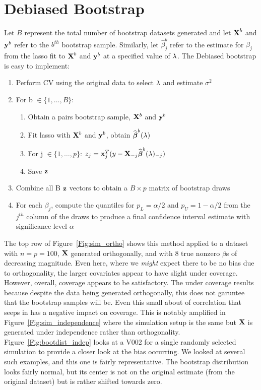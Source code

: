 \section{Debiased Bootstrap}

Let $B$ represent the total number of bootstrap datasets generated and let $\boldsymbol{\mathbf{X}}^b$ and $\boldsymbol{\mathbf{y}}^{b}$ refer to the $b^{th}$ bootstrap sample. Similarly, let $\hat{\beta}^b_j$ refer to the estimate for $\beta_j$ from the lasso fit to $\boldsymbol{\mathbf{X}}^b$ and $\boldsymbol{\mathbf{y}}^b$ at a specified value of $\lambda$. The Debiased bootstrap is easy to implement:

\begin{enumerate}
\item Perform CV using the original data to select $\lambda$ and estimate $\sigma^2$
\item For b $\in \lbrace 1, \ldots, B \rbrace$:
\begin{enumerate}
\item Obtain a pairs bootstrap sample, $\mathbf{X}^b$ and $\mathbf{y}^b$
\item Fit lasso with $\mathbf{X}^b$ and $\mathbf{y}^b$, obtain $\widehat{\boldsymbol{\beta}}^b(\lambda)$
\item For j $\in \lbrace 1, \ldots, p \rbrace$:
    $z_j = \mathbf{x}_j^T(y - \mathbf{X}_{-j}\widehat{\boldsymbol{\beta}}^b(\lambda)_{-j})$
\item Save $\mathbf{z}$
\end{enumerate}
\item Combine all B $\mathbf{z}$ vectors to obtain a $B \times p$ matrix of bootstrap draws
\item For each $\beta_j$, compute the quantiles for $p_L = \alpha/2$ and $p_U = 1 - \alpha/2$ from the $j^{th}$ column of the draws to produce a final confidence interval estimate with significance level $\alpha$
\end{enumerate}

The top row of Figure~\ref{Fig:sim_ortho} shows this method applied to a dataset with $n = p = 100$, $\mathbf{X}$ generated orthogonally, and with 8 true nonzero $\beta$s of decreasing magnitude. Even here, where we \emph{might} expect there to be no bias due to orthogonality, the larger covariates appear to have slight under coverage. However, overall, coverage appears to be satisfactory. The under coverage results because despite the data being generated orthogonally, this does not garuntee that the bootstrap samples will be. Even this small about of correlation that seeps in has a negative impact on coverage. This is notably amplified in Figure~\ref{Fig:sim_independence} where the simulation setup is the same but $\mathbf{X}$ is generated under independence rather than orthogonality. Figure~\ref{Fig:bootdist_indep} looks at a V002 for a single randomly selected simulation to provide a closer look at the bias occurring. We looked at several such examples, and this one is fairly representative. The bootstrap distribution looks fairly normal, but its center is not on the original estimate (from the original dataset) but is rather shifted towards zero.

